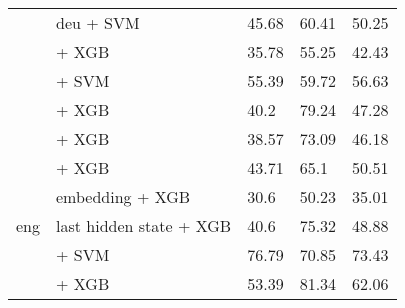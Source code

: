 \begin{table*}[ht]
\begin{tabular}{@{}llp{1.1cm}p{1.1cm}p{1.1cm}@{}}
                                           & \citep{mohr2024multi} deu + SVM                                    & 45.68                           & 60.41                              & 50.25                             \\
                                           & \citep{sturua2024jinaembeddingsv3multilingualembeddingstask} + XGB & 35.78                           & 55.25                              & 42.43                             \\
                                           & \citep{sturua2024jinaembeddingsv3multilingualembeddingstask} + SVM & 55.39                           & 59.72                              & 56.63                             \\
                                           & \citep{ni2021sentencet5scalablesentenceencoders} + XGB             & 40.2                            & 79.24                              & 47.28                             \\
                                           & \citep{wang2023improving} + XGB                                    & 38.57                           & 73.09                              & 46.18                             \\
        \midrule
        \multirow{16}{*}{eng}              & \citep{all-MiniLM-L12-v2}  + XGB                                   & 43.71                           & 65.1                               & 50.51                             \\
                                           & \citep{DBLP:journals/corr/abs-1810-04805} embedding + XGB          & 30.6                            & 50.23                              & 35.01                             \\
                                           & \citep{DBLP:journals/corr/abs-1810-04805} last hidden state + XGB  & 40.6                            & 75.32                              & 48.88                             \\
                                           & \citep{wang2024multilingual} + SVM                                 & 76.79                           & 70.85                              & 73.43                             \\
                                           & \citep{zhang2025jasperstelladistillationsota} + XGB                & 53.39                           & 81.34                              & 62.06                             \\

\end{tabular}
\end{table*}
